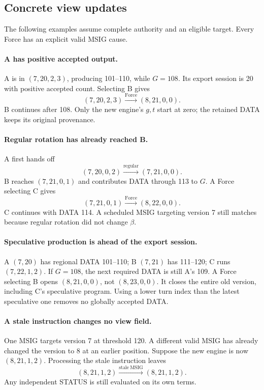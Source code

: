 \subsection{Concrete view updates}
\label{sec:force-view-examples}
The following examples assume complete authority and an eligible target.
Every Force has an explicit valid MSIG cause.

\paragraph{A has positive accepted output.}
A is in $(7,20,2,3)$, producing 101--110, while $G=108$.
Its export session is 20 with positive accepted count. Selecting B gives
\[
 (7,20,2,3)\xrightarrow{\mathrm{Force}}(8,21,0,0).
\]
B continues after 108. Only the new engine's $g,t$ start at zero;
the retained DATA keeps its original provenance.

\paragraph{Regular rotation has already reached B.}
A first hands off
\[
 (7,20,0,2)\xrightarrow{\mathrm{regular}}(7,21,0,0).
\]
B reaches $(7,21,0,1)$ and contributes DATA through 113 to $G$.
A Force selecting C gives
\[
 (7,21,0,1)\xrightarrow{\mathrm{Force}}(8,22,0,0).
\]
C continues with DATA 114. A scheduled MSIG targeting version 7
still matches because regular rotation did not change $\beta$.

\paragraph{Speculative production is ahead of the export session.}
A $(7,20)$ has regional DATA 101--110; B $(7,21)$ has 111--120;
C runs $(7,22,1,2)$. If $G=108$, the next required DATA is still
A's 109. A Force selecting B opens $(8,21,0,0)$, not $(8,23,0,0)$.
It closes the entire old version, including C's speculative program.
Using a lower turn index than the latest speculative one removes no
globally accepted DATA.

\paragraph{A stale instruction changes no view field.}
One MSIG targets version 7 at threshold 120. A different valid MSIG
has already changed the version to 8 at an earlier position.
Suppose the new engine is now $(8,21,1,2)$. Processing the stale
instruction leaves
\[
 (8,21,1,2)\xrightarrow{\mathrm{stale\ MSIG}}(8,21,1,2).
\]
Any independent STATUS is still evaluated on its own terms.

